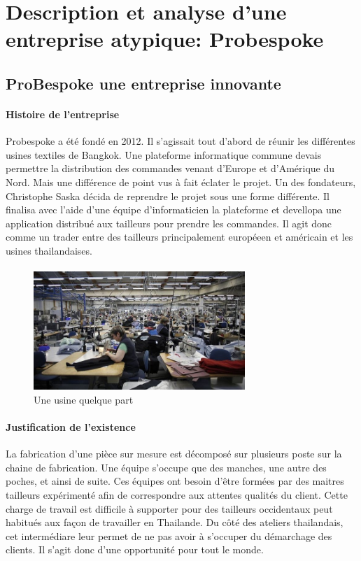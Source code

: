 \section{Description et analyse d'une entreprise atypique: Probespoke}
\subsection{ProBespoke une entreprise innovante}

\paragraph{Histoire de l'entreprise}
Probespoke a été fondé en 2012. Il s'agissait tout d'abord de réunir les différentes usines textiles de Bangkok.
Une plateforme informatique commune devais permettre la distribution des commandes venant d'Europe et d'Amérique du Nord.
Mais une différence de point vus à fait éclater le projet. Un des fondateurs, Christophe Saska décida de reprendre le projet sous une forme différente. Il finalisa avec l'aide d'une équipe d'informaticien la plateforme et devellopa une application distribué aux tailleurs pour prendre les commandes. Il agit donc comme un trader entre des tailleurs principalement européeen et américain et les usines thailandaises.
\paragraph{}

\paragraph{}
\clearpage
\begin{figure}
\includegraphics[width=8cm]{image/textile.jpg}
\caption{Une usine quelque part}
\end{figure}
\paragraph{Justification de l'existence}
 La fabrication d'une pièce sur mesure est décomposé sur plusieurs poste sur la chaine de fabrication. Une équipe s'occupe que des manches, une autre des poches, et ainsi de suite. Ces équipes ont besoin d'être formées par des maitres tailleurs expérimenté afin de correspondre aux attentes qualités du client. Cette charge de travail est difficile à supporter pour des tailleurs occidentaux peut habitués aux façon de travailler en Thailande. Du côté des ateliers thailandais, cet intermédiare leur permet de ne pas avoir à s'occuper du démarchage des clients. Il s'agit donc d'une opportunité pour tout le monde.
